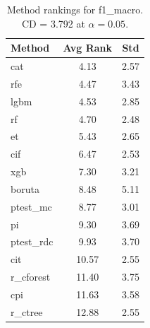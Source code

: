 \begin{table}[h]
\centering
\caption{Method rankings for f1_macro. CD = 3.792 at $\alpha=0.05$.}
\label{tab:ranks_f1_macro}
\begin{tabular}{lcc}
\toprule
Method & Avg Rank & Std \\
\midrule
cat & 4.13 & 2.57 \\
rfe & 4.47 & 3.43 \\
lgbm & 4.53 & 2.85 \\
rf & 4.70 & 2.48 \\
et & 5.43 & 2.65 \\
cif & 6.47 & 2.53 \\
xgb & 7.30 & 3.21 \\
boruta & 8.48 & 5.11 \\
ptest_mc & 8.77 & 3.01 \\
pi & 9.30 & 3.69 \\
ptest_rdc & 9.93 & 3.70 \\
cit & 10.57 & 2.55 \\
r_cforest & 11.40 & 3.75 \\
cpi & 11.63 & 3.58 \\
r_ctree & 12.88 & 2.55 \\
\bottomrule
\end{tabular}
\end{table}